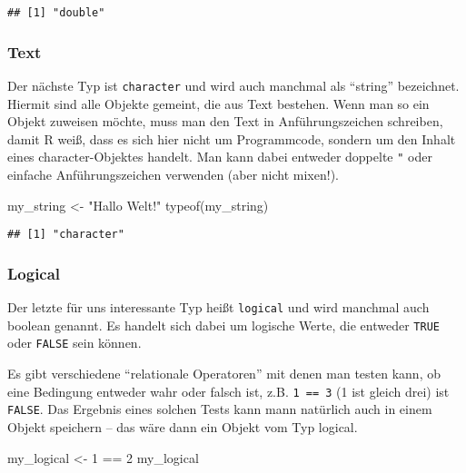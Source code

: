 \documentclass[
]{book}
\newenvironment{Shaded}{\begin{snugshade}}{\end{snugshade}}
\newcommand{\DecValTok}[1]{\textcolor[rgb]{0.00,0.00,0.81}{#1}}
\newcommand{\FunctionTok}[1]{\textcolor[rgb]{0.00,0.00,0.00}{#1}}
\newcommand{\NormalTok}[1]{#1}
\newcommand{\OtherTok}[1]{\textcolor[rgb]{0.56,0.35,0.01}{#1}}
\newcommand{\SpecialCharTok}[1]{\textcolor[rgb]{0.00,0.00,0.00}{#1}}
\newcommand{\StringTok}[1]{\textcolor[rgb]{0.31,0.60,0.02}{#1}}
\begin{document}
\begin{verbatim}
## [1] "double"
\end{verbatim}

\hypertarget{text}{%
\subsubsection{Text}\label{text}}

Der nächste Typ ist \texttt{character} und wird auch manchmal als ``string'' bezeichnet. Hiermit sind alle Objekte gemeint, die aus Text bestehen. Wenn man so ein Objekt zuweisen möchte, muss man den Text in Anführungszeichen schreiben, damit R weiß, dass es sich hier nicht um Programmcode, sondern um den Inhalt eines character-Objektes handelt. Man kann dabei entweder doppelte \texttt{"} oder einfache \texttt{\textquotesingle{}} Anführungszeichen verwenden (aber nicht mixen!).

\begin{Shaded}
\begin{Highlighting}[]
\NormalTok{my\_string }\OtherTok{\textless{}{-}} \StringTok{"Hallo Welt!"}
\FunctionTok{typeof}\NormalTok{(my\_string)}
\end{Highlighting}
\end{Shaded}

\begin{verbatim}
## [1] "character"
\end{verbatim}

\hypertarget{logical}{%
\subsubsection{Logical}\label{logical}}

Der letzte für uns interessante Typ heißt \texttt{logical} und wird manchmal auch boolean genannt. Es handelt sich dabei um logische Werte, die entweder \texttt{TRUE} oder \texttt{FALSE} sein können.

Es gibt verschiedene ``relationale Operatoren'' mit denen man testen kann, ob eine Bedingung entweder wahr oder falsch ist, z.B. \texttt{1\ ==\ 3} (1 ist gleich drei) ist \texttt{FALSE}. Das Ergebnis eines solchen Tests kann mann natürlich auch in einem Objekt speichern -- das wäre dann ein Objekt vom Typ logical.

\begin{Shaded}
\begin{Highlighting}[]
\NormalTok{my\_logical }\OtherTok{\textless{}{-}} \DecValTok{1} \SpecialCharTok{==} \DecValTok{2}
\NormalTok{my\_logical}
\end{Highlighting}
\end{Shaded}
\end{document}
